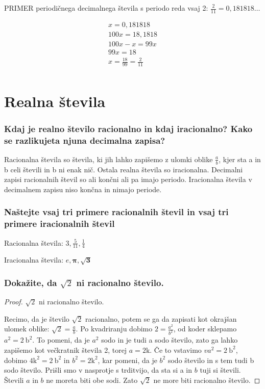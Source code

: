 \documentclass{article}
\begin{document}
PRIMER periodičnega decimalnega števila s periodo reda vsaj 2: $\frac{2}{11}=0,181818 \ldots$

\begin{gather*}
    x=0,181818 \\
    100 x=18,1818 \\
    100 x-x=99 x \\
    99 x=18 \\
    x=\frac{18}{99}=\frac{2}{11} \\
\end{gather*}


\section{Realna števila}
\subsubsection*{Kdaj je realno število racionalno in kdaj iracionalno? Kako se razlikujeta njuna decimalna zapisa?}

Racionalna števila so števila, ki jih lahko zapišemo z ulomki oblike $\frac{a}{b}$, kjer sta a in b celi števili in b ni enak nič. Ostala realna števila so iracionalna. Decimalni zapisi racionalnih števil so ali končni ali pa imajo periodo. Iracionalna števila v decimalnem zapisu niso končna in nimajo periode.

\subsubsection*{Naštejte vsaj tri primere racionalnih števil in vsaj tri primere iracionalnih števil}

Racionalna števila: $3, \frac{5}{11}, \frac{1}{4}$

Iracionalna števila: $e, \boldsymbol{\pi}, \sqrt{\mathbf{3}}$

\subsubsection*{Dokažite, da $\sqrt{2}$ ni racionalno število.}
\begin{proof}
    $\sqrt{2}$ ni racionalno število.

    Recimo, da je število $\sqrt{2}$ racionalno, potem se ga da zapisati kot okrajšan ulomek oblike: $\sqrt{2}=\frac{a}{b}$. Po kvadriranju dobimo $2=\frac{a^{2}}{b^{2}}$, od koder sklepamo $a^{2}=2 \mathrm{~b}^{2}$. To pomeni, da je $a^{2}$ sodo in je tudi a sodo število, zato ga lahko zapišemo kot večkratnik števila 2, torej $a=2 \mathrm{k}$. Če to vstavimo $v a^{2}=2 \mathrm{~b}^{2}$, dobimo $4 \mathrm{k}^{2}=2 \mathrm{~b}^{2}$ in $b^{2}=2 \mathrm{k}^{2}$, kar pomeni, da je $b^{2}$ sodo število in s tem tudi b sodo število. Prišli smo v nasprotje s trditvijo, da sta si a in $b$ tuji si števili. Števili $a$ in $b$ ne moreta biti obe sodi. Zato $\sqrt{2}$ ne more biti racionalno število.
\end{proof}
\end{document}
